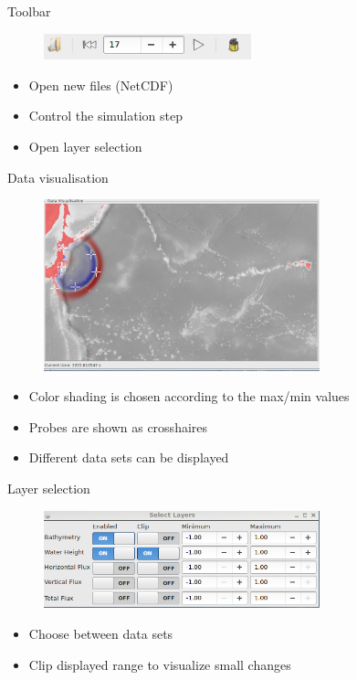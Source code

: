 \documentclass[shortpres,usenames,dvipsnames]{beamer}
\begin{document}
\begin{frame}[fragile]{Toolbar}
	\begin{figure}
		\includegraphics[clip, width=60mm]{img/toolbar.png}
	\end{figure}
	\begin{itemize}
		\item Open new files (NetCDF)
		\item Control the simulation step
		\item Open layer selection
	\end{itemize}
\end{frame}

\begin{frame}[fragile]{Data visualisation}
	\begin{figure}
		\includegraphics[clip, width=80mm]{img/datavis.png}
	\end{figure}
	\begin{itemize}
		\item Color shading is chosen according to the max/min values
		\item Probes are shown as crosshaires
		\item Different data sets can be displayed
	\end{itemize}
\end{frame}

\begin{frame}[fragile]{Layer selection}
	\begin{figure}
		\includegraphics[clip, width=80mm]{img/layerselect.png}
	\end{figure}
	\begin{itemize}
		\item Choose between data sets
		\item Clip displayed range to visualize small changes
	\end{itemize}
\end{frame}
\end{document}

